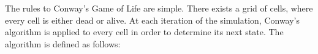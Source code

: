\documentclass[onecolumn,12pt]{IEEEtran}
\begin{document}
  The rules to Conway's Game of Life are simple. There exists a grid of cells,
  where every cell is either dead or alive. At each iteration of the simulation,
  Conway's algorithm is applied to every cell in order to determine its next
  state. The algorithm is defined as follows:

\end{document}
